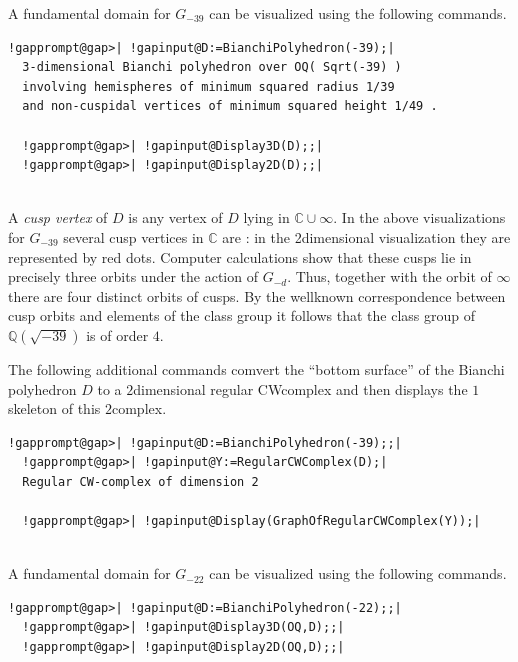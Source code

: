 \documentclass[a4paper,11pt]{report}
\begin{document}
{{A fundamental domain for $G_{-39}$ can be visualized using the following commands. 
\begin{Verbatim}[commandchars=!@|,fontsize=\small,frame=single,label=Example]
  !gapprompt@gap>| !gapinput@D:=BianchiPolyhedron(-39);|
  3-dimensional Bianchi polyhedron over OQ( Sqrt(-39) ) 
  involving hemispheres of minimum squared radius 1/39 
  and non-cuspidal vertices of minimum squared height 1/49 . 
  
  !gapprompt@gap>| !gapinput@Display3D(D);;|
  !gapprompt@gap>| !gapinput@Display2D(D);;|
  
\end{Verbatim}
   

 A \emph{cusp vertex} of $D$ is any vertex of $D$ lying in $\mathbb C \cup \infty$. In the above visualizations for $G_{-39}$ several cusp vertices in $\mathbb C$ are : in the 2\texttt{}dimensional visualization they are
represented by red dots. Computer calculations show that these cusps lie in
precisely three orbits under the action of $G_{-d}$. Thus, together with the orbit of $\infty$ there are four distinct orbits of cusps. By the well\texttt{}known
correspondence between cusp orbits and elements of the class group it follows
that the class group of $\mathbb Q(\sqrt{-39})$ is of order $4$. 

The following additional commands comvert the ``bottom surface'' of the
Bianchi polyhedron $D$ to a $2$\texttt{}dimensional regular CW\texttt{}complex and then
displays the $1$\texttt{}skeleton of this $2$\texttt{}complex. 
\begin{Verbatim}[commandchars=!@|,fontsize=\small,frame=single,label=Example]
  !gapprompt@gap>| !gapinput@D:=BianchiPolyhedron(-39);;|
  !gapprompt@gap>| !gapinput@Y:=RegularCWComplex(D);|
  Regular CW-complex of dimension 2
  
  !gapprompt@gap>| !gapinput@Display(GraphOfRegularCWComplex(Y));|
  
\end{Verbatim}
  

A fundamental domain for $G_{-22}$ can be visualized using the following commands. 
\begin{Verbatim}[commandchars=!@|,fontsize=\small,frame=single,label=Example]
  !gapprompt@gap>| !gapinput@D:=BianchiPolyhedron(-22);;|
  !gapprompt@gap>| !gapinput@Display3D(OQ,D);;|
  !gapprompt@gap>| !gapinput@Display2D(OQ,D);;|
  
\end{Verbatim}
   

}}
\end{document}
